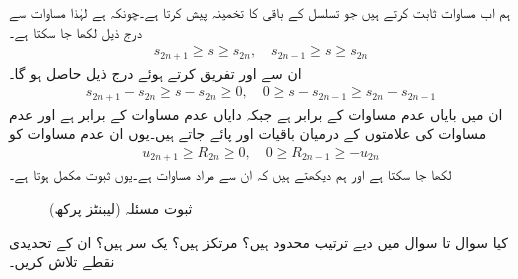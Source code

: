 ہم اب مساوات  ثابت کرتے ہیں جو تسلسل کے باقی کا تخمینہ پیش کرتا ہے۔چونکہ  ہے  لہٰذا مساوات  سے درج ذیل لکھا جا سکتا ہے۔
\begin{align*}
s_{2n+1}\ge s\ge s_{2n},\quad s_{2n-1}\ge s\ge s_{2n} 
\end{align*}
ان سے  اور  تفریق کرتے ہوئے درج ذیل حاصل ہو گا۔
\begin{align*}
s_{2n+1}-s_{2n}\ge s-s_{2n}\ge 0,\quad 0\ge s-s_{2n-1}\ge s_{2n}-s_{2n-1}
\end{align*}
ان میں بایاں عدم مساوات  کے برابر ہے جبکہ دایاں عدم مساوات  کے برابر ہے  اور عدم مساوات کی علامتوں کے درمیان باقیات  اور  پائے جاتے ہیں۔یوں ان عدم مساوات کو
\begin{align*}
u_{2n+1}\ge R_{2n}\ge 0,\quad 0\ge R_{2n-1}\ge -u_{2n}
\end{align*}  
لکھا جا سکتا ہے اور ہم دیکھتے ہیں کہ ان سے مراد مساوات  ہے۔یوں ثبوت مکمل ہوتا ہے۔
\begin{figure}
\centering
{}
\caption{ثبوت مسئلہ  (لیبنٹز پرکھ)}
\label{شکل_مسئلہ_ترتیب_آزمائش_لیبنٹز}
\end{figure}

کیا سوال  تا سوال  میں دیے ترتیب محدود ہیں؟ مرتکز ہیں؟ یک سر ہیں؟ ان کے تحدیدی نقطے تلاش کریں۔ 

